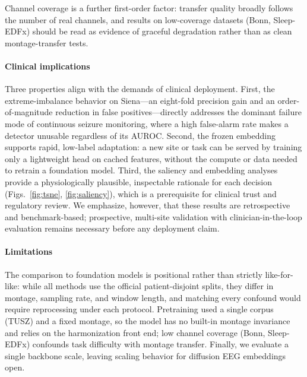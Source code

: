 \documentclass[journal]{IEEEtran}
\begin{document}
Channel coverage is a further first-order factor: transfer quality broadly
follows the number of real channels, and results on low-coverage datasets (Bonn,
Sleep-EDFx) should be read as evidence of graceful degradation rather than as
clean montage-transfer tests.

\paragraph{Clinical implications} Three properties align with the demands of
clinical deployment. First, the extreme-imbalance behavior on Siena---an
eight-fold precision gain and an order-of-magnitude reduction in false
positives---directly addresses the dominant failure mode of continuous seizure
monitoring, where a high false-alarm rate makes a detector unusable regardless of
its AUROC. Second, the frozen embedding supports rapid, low-label adaptation: a
new site or task can be served by training only a lightweight head on cached
features, without the compute or data needed to retrain a foundation model.
Third, the saliency and embedding analyses provide a physiologically plausible,
inspectable rationale for each decision (Figs.~\ref{fig:tsne},
\ref{fig:saliency}), which is a prerequisite for clinical trust and regulatory
review. We emphasize, however, that these results are retrospective and
benchmark-based; prospective, multi-site validation with clinician-in-the-loop
evaluation remains necessary before any deployment claim.

\paragraph{Limitations} The comparison to foundation models is positional rather
than strictly like-for-like: while all methods use the official patient-disjoint
splits, they differ in montage, sampling rate, and window length, and matching
every confound would require reprocessing under each protocol. Pretraining used a
single corpus (TUSZ) and a fixed montage, so the model has no built-in montage
invariance and relies on the harmonization front end; low channel coverage (Bonn,
Sleep-EDFx) confounds task difficulty with montage transfer. Finally, we evaluate
a single backbone scale, leaving scaling behavior for diffusion EEG embeddings
open.

\end{document}
